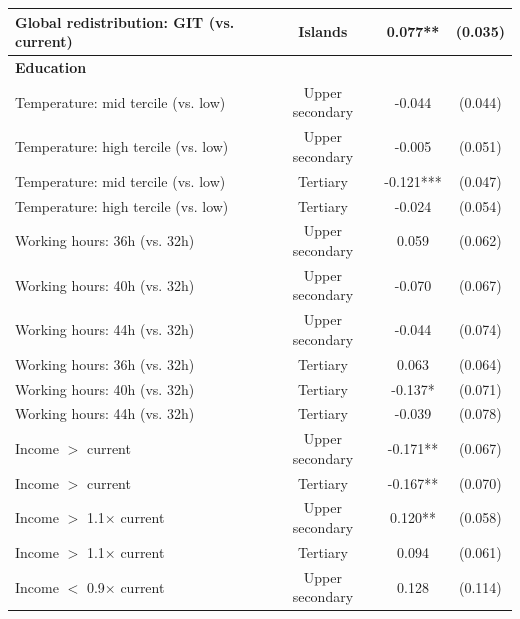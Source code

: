 \begin{table}[H]
\begin{tabular}{ l c c c }
\hspace{0.05cm} Global redistribution: GIT (vs. current) & Islands & 0.077** & (0.035) \\
\hline
\multicolumn{4}{l}{\textbf{Education}} \\
\hspace{0.05cm} Temperature: mid tercile (vs. low) & Upper secondary & -0.044 & (0.044) \\
\hspace{0.05cm} Temperature: high tercile (vs. low) & Upper secondary & -0.005 & (0.051) \\
\hspace{0.05cm} Temperature: mid tercile (vs. low) & Tertiary & -0.121*** & (0.047) \\
\hspace{0.05cm} Temperature: high tercile (vs. low) & Tertiary & -0.024 & (0.054) \\
\hspace{0.05cm} Working hours: 36h (vs. 32h) & Upper secondary & 0.059 & (0.062) \\
\hspace{0.05cm} Working hours: 40h (vs. 32h) & Upper secondary & -0.070 & (0.067) \\
\hspace{0.05cm} Working hours: 44h (vs. 32h) & Upper secondary & -0.044 & (0.074) \\
\hspace{0.05cm} Working hours: 36h (vs. 32h) & Tertiary & 0.063 & (0.064) \\
\hspace{0.05cm} Working hours: 40h (vs. 32h) & Tertiary & -0.137* & (0.071) \\
\hspace{0.05cm} Working hours: 44h (vs. 32h) & Tertiary & -0.039 & (0.078) \\
\hspace{0.05cm} Income $>$ current & Upper secondary & -0.171** & (0.067) \\
\hspace{0.05cm} Income $>$ current & Tertiary & -0.167** & (0.070) \\
\hspace{0.05cm} Income $>$ 1.1$\times$ current & Upper secondary & 0.120** & (0.058) \\
\hspace{0.05cm} Income $>$ 1.1$\times$ current & Tertiary & 0.094 & (0.061) \\
\hspace{0.05cm} Income $<$ 0.9$\times$ current & Upper secondary & 0.128 & (0.114) \\

\end{tabular}
\end{table}
